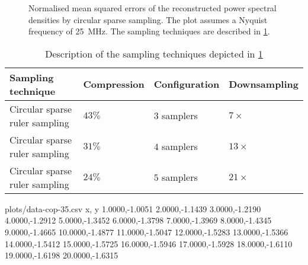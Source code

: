 \documentclass[a4paper, openany, oneside]{memoir}
\begin{document}
\begin{figure}
	\centering
	\caption{Normalised mean squared errors of the reconstructed power spectral densities by circular sparse sampling. The plot assumes a Nyquist frequency of \SI{25}{MHz}. The sampling techniques are described in \cref{tab:sampling-nmse-circ}.}
	\label{fig:plot-nmse-circ}
\end{figure}

\begin{table}
	\centering
	\begin{tabular}{llll}
		\textbf{Sampling technique} & \textbf{Compression} & \textbf{Configuration} & \textbf{Downsampling} \\ \hline
		Circular sparse ruler sampling & $43\%$ & $3$ samplers & $7 \times$ \\
		Circular sparse ruler sampling & $31\%$ & $4$ samplers & $13 \times$ \\
		Circular sparse ruler sampling & $24\%$ & $5$ samplers & $21 \times$ \\
	\end{tabular}
	\caption{Description of the sampling techniques depicted in \cref{fig:plot-nmse-circ}}
	\label{tab:sampling-nmse-circ}
\end{table}



\begin{filecontents*}{plots/data-cop-35.csv}
x, y
1.0000,-1.0051
2.0000,-1.1439
3.0000,-1.2190
4.0000,-1.2912
5.0000,-1.3452
6.0000,-1.3798
7.0000,-1.3969
8.0000,-1.4345
9.0000,-1.4665
10.0000,-1.4877
11.0000,-1.5047
12.0000,-1.5283
13.0000,-1.5366
14.0000,-1.5412
15.0000,-1.5725
16.0000,-1.5946
17.0000,-1.5928
18.0000,-1.6110
19.0000,-1.6198
20.0000,-1.6315
\end{filecontents*}
\end{document}
